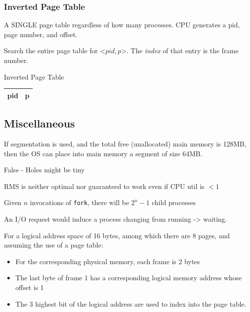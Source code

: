 \documentclass[a4paper]{article}
\begin{document}
\begin{multicols*}{2}
    \subsubsection*{Inverted Page Table}
    A SINGLE page table regardless of how many processes.
    CPU generates a pid, page number, and offset.
    \begin{multicols*}{2}
        Search the entire page table for <\(pid, p\)>.
        The \emph{index} of that entry is the frame number.
        \columnbreak
        \begin{center}
            Inverted Page Table \\
            \begin{tabular}{|cc|}
                \hline
                pid & p \\
                \hline
            \end{tabular}
        \end{center}
    \end{multicols*}

    \subsection*{Miscellaneous}
    If segmentation is used, and the total free (unallocated) main memory is
    128MB, then the OS can place into main memory a segment of size 64MB.

    False - Holes might be tiny

    RMS is neither optimal nor guaranteed to work even if CPU util is \(< 1\)

    Given \(n\) invocations of \texttt{fork}, there will be \(2^n - 1\) child
    processes

    An I/O request would induce a process changing from running -> waiting.

    For a logical address space of 16 bytes, among which there are 8 pages, and
    assuming the use of a page table:

    \begin{itemize}
        \item For the corresponding physical memory, each frame is 2 bytes
        \item The last byte of frame 1 has a corresponding logical memory address whose offset is 1
        \item The 3 highest bit of the logical address are used to index into the page table.
    \end{itemize}


\end{multicols*}
\end{document}
